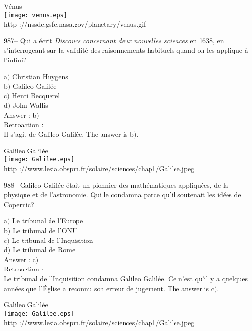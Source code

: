 ﻿\documentclass[letterpaper, 12pt]{article}
\begin{document}
        \begin{center}
        V\'enus\\
    \texttt{[image: venus.eps]}\\
        {\footnotesize http ://nssdc.gsfc.nasa.gov/planetary/venus.gif}
    \end{center}

987-- Qui a \'ecrit {\sl Discours concernant deux nouvelles
sciences} en 1638, en s'interrogeant sur la validit\'e des
raisonnements habituels quand on les applique \`a l'infini?

a$)$ Christian Huygens \\
b$)$ Galileo Galil\'ee \\
c$)$ Henri Becquerel \\
d$)$ John Wallis\\

Answer : b$)$\\

Retroaction :\\
Il s'agit de Galileo Galil\'ee. The answer is b$)$.

        \begin{center}
        Galileo Galil\'ee\\
    \texttt{[image: Galilee.eps]}\\
        {\footnotesize http
://www.lesia.obspm.fr/solaire/sciences/chap1/Galilee.jpeg}
    \end{center}

988-- Galileo Galil\'ee \'etait un pionnier des math\'ematiques
appliqu\'ees, de la physique et de l'astronomie. Qui le condamna
parce qu'il soutenait les id\'ees de Copernic?

a$)$ Le tribunal de l'Europe \\
b$)$ Le tribunal de l'ONU \\
c$)$ Le tribunal de l'Inquisition \\
d$)$ Le tribunal de Rome\\

Answer : c$)$\\

Retroaction : \\
Le tribunal de l'Inquisition condamna Galileo Galil\'ee. Ce n'est
qu'il y a quelques ann\'ees que l'\'Eglise a reconnu son erreur de
jugement.
The answer is c$)$.\\

        \begin{center}
        Galileo Galil\'ee\\
    \texttt{[image: Galilee.eps]}\\
        {\footnotesize http
://www.lesia.obspm.fr/solaire/sciences/chap1/Galilee.jpeg}
    \end{center}
\end{document}
